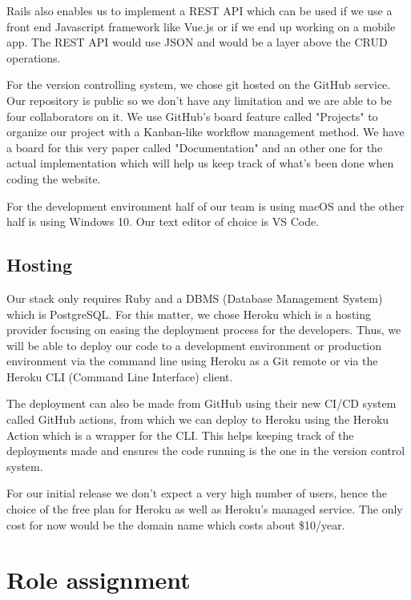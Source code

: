 \documentclass[conference]{IEEEtran}
\begin{document}
Rails also enables us to implement a REST API which can be used if we use a front end Javascript framework like Vue.js or if we end up working on a mobile app. The REST API would use JSON and would be a layer above the CRUD operations.

For the version controlling system, we chose git hosted on the GitHub service. Our repository is public so we don't have any limitation and we are able to be four collaborators on it. We use GitHub's board feature called "Projects" to organize our project with a Kanban-like workflow management method. We have a board for this very paper called "Documentation" and an other one for the actual implementation which will help us keep track of what's been done when coding the website.

For the development environment half of our team is using macOS and the other half is using Windows 10. Our text editor of choice is VS Code.

\subsection{Hosting}

Our stack only requires Ruby and a DBMS (Database Management System) which is PostgreSQL. For this matter, we chose Heroku which is a hosting provider focusing on easing the deployment process for the developers. Thus, we will be able to deploy our code to a development environment or production environment via the command line using Heroku as a Git remote or via the Heroku CLI (Command Line Interface) client.

The deployment can also be made from GitHub using their new CI/CD system called GitHub actions, from which we can deploy to Heroku using the Heroku Action which is a wrapper for the CLI. This helps keeping track of the deployments made and ensures the code running is the one in the version control system.

For our initial release we don't expect a very high number of users, hence the choice of the free plan for Heroku as well as Heroku's managed service. The only cost for now would be the domain name which costs about \$10/year.


\section{Role assignment}
\end{document}
